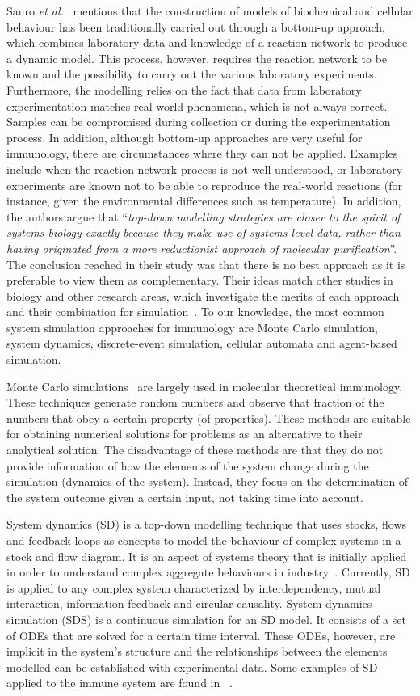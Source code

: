 \documentclass{llncs}
\begin{document}
Sauro {\it et al.}~\cite{Sauro:2006} mentions that the construction of models of biochemical and cellular behaviour has been traditionally carried out through a bottom-up approach, which combines laboratory data and knowledge of a reaction network to produce a dynamic model. This process, however, requires the reaction network to be known and the possibility to carry out the various laboratory experiments. Furthermore, the modelling relies on the fact that data from laboratory experimentation matches real-world phenomena, which is not always correct. Samples can be compromised during collection or during the experimentation process. In addition, although bottom-up approaches are very useful for immunology, there are circumstances where they can not be applied. Examples include when the reaction network process is not well understood, or laboratory experiments are known not to be able to reproduce the real-world reactions (for instance, given the environmental differences such as temperature). In addition, the authors argue that ``{\it top-down modelling strategies are closer to the spirit of systems biology exactly because they make use of systems-level data, rather than having originated from a more reductionist approach of molecular purification}''. The conclusion reached in their study was that there is no best approach as it is preferable to view them as complementary. Their ideas match other studies in biology and other research areas, which investigate the merits of each approach and their combination for simulation~\cite{Schieritz:2003}. To our knowledge, the most common system simulation approaches for immunology are Monte Carlo simulation, system dynamics, discrete-event simulation, cellular automata and agent-based simulation.

Monte Carlo simulations~\cite{Metropolis:1949} are largely used in molecular theoretical immunology. These techniques generate random numbers and observe that fraction of the numbers that obey a certain property (of properties). These methods are suitable for obtaining numerical solutions for problems as an alternative to their analytical solution. The disadvantage of these methods are that they do not provide information of how the elements of the system change during the simulation (dynamics of the system). Instead, they focus on the determination of the system outcome given a certain input, not taking time into account.

System dynamics (SD) is a top-down modelling technique that uses stocks, flows and feedback loops as concepts to model the behaviour of complex systems in a stock and flow diagram. It is an aspect of systems theory that is initially applied in order to understand complex aggregate behaviours in industry~\cite{Forrester:1961}. Currently, SD is applied to any complex system characterized by interdependency, mutual interaction, information feedback and circular causality. System dynamics simulation (SDS) is a continuous simulation for an SD model. It consists of a set of ODEs that are solved for a certain time interval.  These ODEs, however, are implicit in the system's structure and the relationships between the elements modelled can be established with experimental data. Some examples of SD applied to the immune system are found in ~\cite{Figueredo:2011,Foan:2011}.
\end{document}
